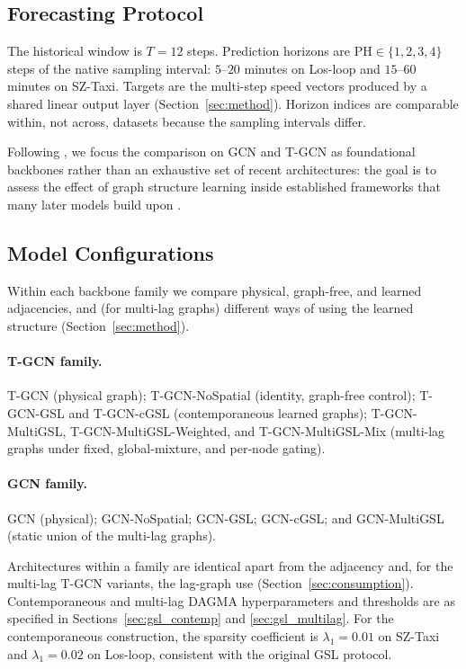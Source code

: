 \subsection{Forecasting Protocol}\label{sec:protocol}

The historical window is $T=12$ steps. Prediction horizons are
$\mathrm{PH}\in\{1,2,3,4\}$ steps of the native sampling interval:
$5$--$20$ minutes on Los-loop and $15$--$60$ minutes on SZ-Taxi. Targets are
the multi-step speed vectors produced by a shared linear output layer
(Section~\ref{sec:method}). Horizon indices are comparable within, not
across, datasets because the sampling intervals differ.

Following \cite{zhao2019t}, we focus the comparison on GCN and T-GCN as
foundational backbones rather than an exhaustive set of recent
architectures: the goal is to assess the effect of graph structure learning
inside established frameworks that many later models build upon
\citep{YU2020189,ZHOU2025110304}.

\subsection{Model Configurations}\label{sec:methods}

Within each backbone family we compare physical, graph-free, and learned
adjacencies, and (for multi-lag graphs) different ways of using the learned
structure (Section~\ref{sec:method}).

\paragraph{T-GCN family.}
T-GCN (physical graph); T-GCN-NoSpatial (identity, graph-free control);
T-GCN-GSL and T-GCN-cGSL (contemporaneous learned graphs);
T-GCN-MultiGSL, T-GCN-MultiGSL-Weighted, and T-GCN-MultiGSL-Mix (multi-lag
graphs under fixed, global-mixture, and per-node gating).

\paragraph{GCN family.}
GCN (physical); GCN-NoSpatial; GCN-GSL; GCN-cGSL; and GCN-MultiGSL (static
union of the multi-lag graphs).

Architectures within a family are identical apart from the adjacency and,
for the multi-lag T-GCN variants, the lag-graph use
(Section~\ref{sec:consumption}). Contemporaneous and multi-lag DAGMA
hyperparameters and thresholds are as specified in
Sections~\ref{sec:gsl_contemp} and \ref{sec:gsl_multilag}. For the
contemporaneous construction, the sparsity coefficient is
$\lambda_1=0.01$ on SZ-Taxi and $\lambda_1=0.02$ on Los-loop, consistent
with the original GSL protocol.

